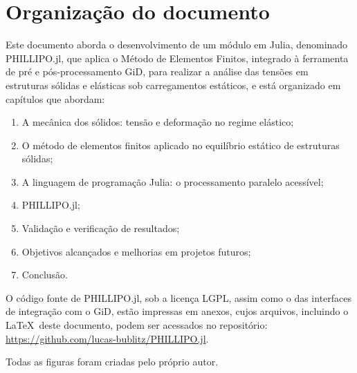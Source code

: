 \section{Organização do documento}

Este documento aborda o desenvolvimento de um módulo em Julia, denominado PHILLIPO.jl, que aplica o Método de Elementos Finitos, integrado à ferramenta de pré e pós-processamento GiD, para realizar a análise das tensões em estruturas sólidas e elásticas sob carregamentos estáticos, e está organizado em capítulos que abordam:

\begin{enumerate}
    \item A mecânica dos sólidos: tensão e deformação no regime elástico;
    \item O método de elementos finitos aplicado no equilíbrio estático de estruturas sólidas;
    \item A linguagem de programação Julia: o processamento paralelo acessível;
    \item PHILLIPO.jl;
    \item Validação e verificação de resultados;
    \item Objetivos alcançados e melhorias em projetos futuros;
    \item Conclusão.
\end{enumerate}

O código fonte de PHILLIPO.jl, sob a licença LGPL, assim como o das interfaces de integração com o GiD, estão impressas em anexos, cujos arquivos, incluindo o \LaTeX\ deste documento, podem ser acessados no repositório: \url{https://github.com/lucas-bublitz/PHILLIPO.jl}.

Todas as figuras foram criadas pelo próprio autor.